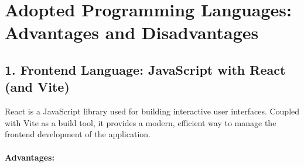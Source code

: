\section{Adopted Programming Languages: Advantages and Disadvantages}

\subsection*{1. Frontend Language: JavaScript with React (and Vite)}
React is a JavaScript library used for building interactive user interfaces. Coupled with Vite as a build tool, it provides a modern, efficient way to manage the frontend development of the application.

\paragraph{Advantages:}
